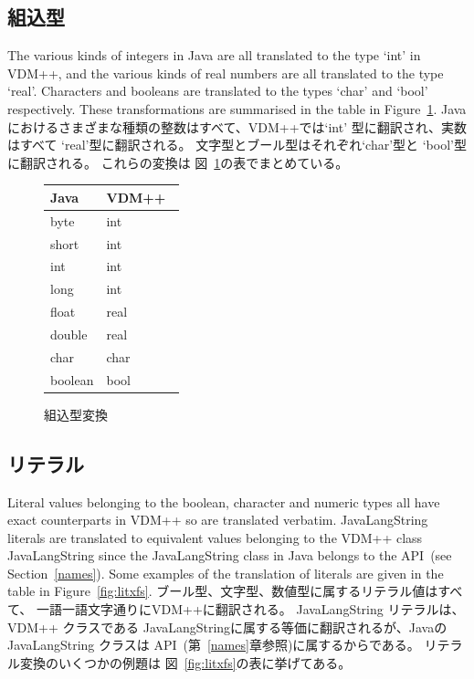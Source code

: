 \documentclass[\pformat,12pt]{jarticle}
\newcommand{\JAVA}{Java}
\newcommand{\VDM}{VDM++}
\begin{document}
\subsection{組込型}\label{types}

The various kinds of integers in Java are all translated to the type
`int' in VDM++, and the various kinds of real numbers are all
translated to the type `real'. Characters and booleans are translated
to the types `char' and `bool' respectively. These transformations are
summarised in the table in Figure~\ref{fig:typexfs}.
Javaにおけるさまざまな種類の整数はすべて、VDM++では`int' 型に翻訳され、実数はすべて `real'型に翻訳される。
文字型とブール型はそれぞれ`char'型と `bool'型に翻訳される。
これらの変換は 図~\ref{fig:typexfs}の表でまとめている。

\begin{figure}[htbp]
  \begin{center}
\begin{longtable}{|l|l|}
\hline
  \JAVA\   & \VDM\ \\ \hline \hline
  byte   & int \\ \hline
  short  & int \\ \hline
  int    & int \\ \hline
  long   & int \\ \hline
  float  & real \\ \hline
  double & real \\ \hline
  char  & char \\ \hline
  boolean  & bool \\ \hline
\end{longtable}    
    \caption{組込型変換}
    \label{fig:typexfs}
  \end{center}
\end{figure}

\subsection{リテラル}\label{literals}

Literal values belonging to the boolean, character and numeric types
all have exact counterparts in VDM++ so are translated
verbatim. JavaLangString literals are translated to equivalent values
belonging to the VDM++ class JavaLangString since the JavaLangString class in
Java belongs to the API~(see Section~\ref{names}). Some
examples of the translation of literals are given in
the table in Figure~\ref{fig:litxfs}.  
ブール型、文字型、数値型に属するリテラル値はすべて、 一語一語文字通りにVDM++に翻訳される。
JavaLangString リテラルは、 VDM++ クラスである JavaLangStringに属する等価に翻訳されるが、Javaの JavaLangString クラスは API~(第~\ref{names}章参照)に属するからである。
リテラル変換のいくつかの例題は 図~\ref{fig:litxfs}の表に挙げてある。
\end{document}
